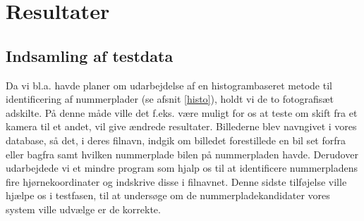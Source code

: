 \section{Resultater}

\subsection{Indsamling af testdata}







Da vi bl.a. havde planer om udarbejdelse af en histogrambaseret metode til identificering af nummerplader (se afsnit \ref{histo}), holdt vi de to fotografisæt adskilte. På denne måde ville det f.eks. være muligt for os at teste om skift fra et kamera til et andet, vil give ændrede resultater. Billederne blev navngivet i vores database, så det, i deres filnavn, indgik om billedet forestillede en bil set forfra eller bagfra samt hvilken nummerplade bilen på nummerpladen havde. Derudover udarbejdede vi et mindre program som hjalp os til at identificere nummerpladens fire hjørnekoordinater og indskrive disse i filnavnet. Denne sidste tilføjelse ville hjælpe os i testfasen, til at undersøge om de nummerpladekandidater vores system ville udvælge er de korrekte.



